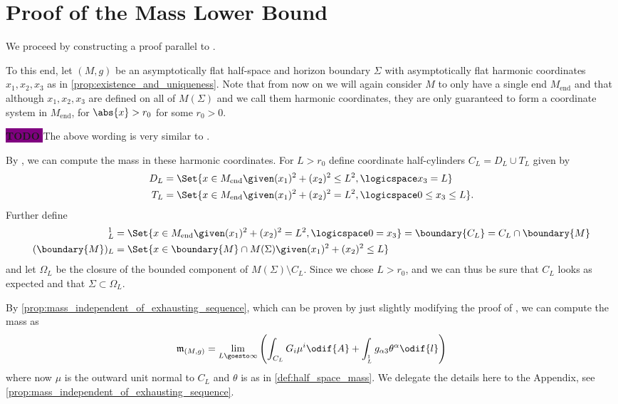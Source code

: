 \documentclass[titlepage,numbers=noenddot,headinclude,oneside,%
footinclude=true,cleardoublepage=empty,%
BCOR=5mm,paper=a4,fontsize=11pt,%
english,%
]{scrartcl}
\let\sphere\relax
\newcommand{\sphere}{\mathbb{S}}
\newcommand{\Mend}{M_{\mathrm{end}}} %
\newcommand{\mass}[2]{\mathfrak{m}_{(#1,#2)}} %
\newcommand{\todomark}{%
    \colorbox{purple}{%
        \textnormal\ttfamily\bfseries\color{white}%
        TODO%
    }%
}
\newcommand{\todo}[1][]{%
    \ifstrempty{#1}{%
        \def\todotext{Todo}%
    }{%
        \def\todotext{Todo: #1}%
    }%
    \todomark%
    {%
        \marginpar{%
            \raggedright\normalfont\sffamily\scriptsize\todotext%
        }%
    }%
}
\begin{document}
\section{Proof of the Mass Lower Bound}
We proceed by constructing a proof parallel to \cite[Section 6]{brayHarmonicFunctionsMass2019}.%

To this end, let \( (M,g) \) be an asymptotically flat half-space and horizon boundary \( \Sigma \) with asymptotically flat harmonic coordinates \( x_1,x_2,x_3 \) as in \cref{prop:existence_and_uniqueness}. Note that from now on we will again consider \( M \) to only have a single end \( \Mend \) and that although \( x_1,x_2,x_3 \) are defined on all of \( M(\Sigma) \) and we call them harmonic coordinates, they are only guaranteed to form a coordinate system in \( \Mend \), \ie for \( \abs{x}>r_0 \) for some \( r_0>0 \).

\todo{The above wording is very similar to \cite[Section 6]{hirschSpacetimeHarmonicFunctions2021}.}

By \cite[Proposition 3.7]{almarazPositiveMassTheorem2016}, we can compute the mass in these harmonic coordinates. For \( L>r_0 \) define coordinate half-cylinders \( C_L=D_L\cup T_L \) given by
\begin{align*}
    D_L&=\Set{x\in \Mend\given (x_1)^2+(x_2)^2\leq L^2,\logicspace x_3=L}\\
    T_L&=\Set{x\in \Mend\given (x_1)^2+(x_2)^2=L^2,\logicspace 0\leq x_3\leq L}.
\end{align*}
Further define
\begin{align*}
    \sphere_L^1&=\Set{x\in \Mend \given (x_1)^2+(x_2)^2=L^2,\logicspace 0=x_3}=\boundary{C_L}=C_L\cap \boundary{M}\\
    (\boundary{M})_L&=\Set{x\in \boundary{M}\cap M(\Sigma)\given (x_1)^2+(x_2)^2\leq L}
\end{align*}
and let \( \Omega_L \) be the closure of the bounded component of \( M(\Sigma)\setminus C_L \). Since we chose \( L>r_0 \), and we can thus be sure that \( C_L  \) looks as expected and that \( \Sigma\subset \Omega_L \).

By \cref{prop:mass_independent_of_exhausting_sequence}, which can be proven by just slightly modifying the proof of \cite[Proposition 3.7]{almarazPositiveMassTheorem2016}, we can compute the mass as
\begin{equation*}
    \mass{M}{g}=\lim_{L \goesto \infty}\left( \int_{C_L}G_i  \mu^i\odif{A}+\int_{\sphere^1_L}g_{\alpha 3}\theta^\alpha\odif{l} \right)
\end{equation*}
where now \( \mu \) is the outward unit normal to \( C_L \) and \( \theta \) is as in \cref{def:half_space_mass}. We delegate the details here to the Appendix, see \cref{prop:mass_independent_of_exhausting_sequence}.
\end{document}
